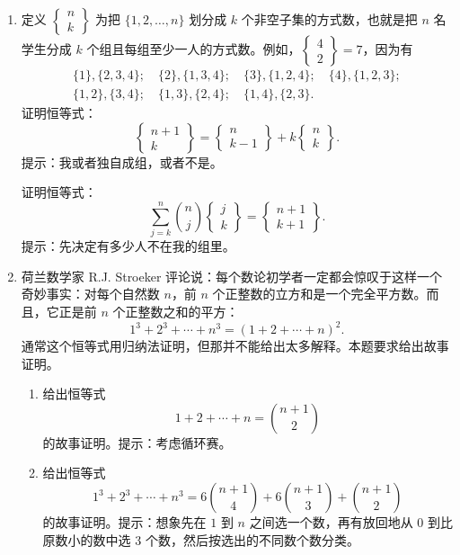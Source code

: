 \documentclass[UTF8,12pt,a4paper,fontset=fandol]{ctexart}
\begin{document}
\begin{enumerate}
  \item 定义 $\left\{\begin{matrix} n\\ k\end{matrix}\right\}$ 为把 $\{1,2,\ldots,n\}$ 划分成 $k$ 个非空子集的方式数，也就是把 $n$ 名学生分成 $k$ 个组且每组至少一人的方式数。例如，$\left\{\begin{matrix}4\\2\end{matrix}\right\}=7$，因为有
  \[
  \begin{gathered}
    \{1\},\{2,3,4\};\quad \{2\},\{1,3,4\};\quad
    \{3\},\{1,2,4\};\quad \{4\},\{1,2,3\};\\
    \{1,2\},\{3,4\};\quad \{1,3\},\{2,4\};\quad
    \{1,4\},\{2,3\}.
  \end{gathered}
  \]
  证明恒等式：
  \[
    \left\{\begin{matrix} n+1\\ k\end{matrix}\right\}
    =
    \left\{\begin{matrix} n\\ k-1\end{matrix}\right\}
    +k\left\{\begin{matrix} n\\ k\end{matrix}\right\}.
  \]
  提示：我或者独自成组，或者不是。

  证明恒等式：
  \[
    \sum_{j=k}^{n}\binom nj
    \left\{\begin{matrix} j\\ k\end{matrix}\right\}
    =
    \left\{\begin{matrix} n+1\\ k+1\end{matrix}\right\}.
  \]
  提示：先决定有多少人不在我的组里。

  \item 荷兰数学家 R.J. Stroeker 评论说：每个数论初学者一定都会惊叹于这样一个奇妙事实：对每个自然数 $n$，前 $n$ 个正整数的立方和是一个完全平方数。而且，它正是前 $n$ 个正整数之和的平方：
  \[
    1^3+2^3+\cdots+n^3=(1+2+\cdots+n)^2.
  \]
  通常这个恒等式用归纳法证明，但那并不能给出太多解释。本题要求给出故事证明。
  \begin{enumerate}
    \item 给出恒等式
    \[
      1+2+\cdots+n=\binom{n+1}{2}
    \]
    的故事证明。提示：考虑循环赛。
    \item 给出恒等式
    \[
      1^3+2^3+\cdots+n^3
      =6\binom{n+1}{4}+6\binom{n+1}{3}+\binom{n+1}{2}
    \]
    的故事证明。提示：想象先在 $1$ 到 $n$ 之间选一个数，再有放回地从 $0$ 到比原数小的数中选 3 个数，然后按选出的不同数个数分类。
  \end{enumerate}
\end{enumerate}
\end{document}
